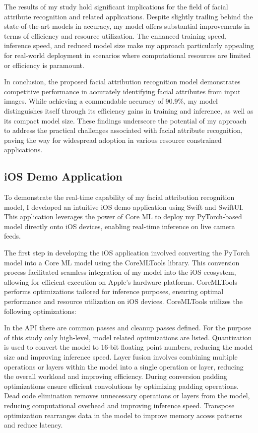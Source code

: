 \documentclass[a4paper,oneside]{article}
\begin{document}
The results of my study hold significant implications for the field of facial attribute recognition and related applications.
Despite slightly trailing behind the state-of-the-art models in accuracy, my model offers substantial improvements in terms of efficiency and resource utilization.
The enhanced training speed, inference speed, and reduced model size make my approach particularly appealing for real-world deployment in scenarios where computational resources are limited or efficiency is paramount.

In conclusion, the proposed facial attribution recognition model demonstrates competitive performance in accurately identifying facial attributes from input images.
While achieving a commendable accuracy of 90.9\%, my model distinguishes itself through its efficiency gains in training and inference, as well as its compact model size.
These findings underscore the potential of my approach to address the practical challenges associated with facial attribute recognition, paving the way for widespread adoption in various resource constrained applications.

\subsection{iOS Demo Application}
\label{sec:subsection_ios_demo}

To demonstrate the real-time capability of my facial attribution recognition model, I developed an intuitive iOS demo application using Swift and SwiftUI.
This application leverages the power of Core ML to deploy my PyTorch-based model directly onto iOS devices, enabling real-time inference on live camera feeds.

The first step in developing the iOS application involved converting the PyTorch model into a Core ML model using the CoreMLTools library.
This conversion process facilitated seamless integration of my model into the iOS ecosystem, allowing for efficient execution on Apple's hardware platforms.
CoreMLTools performs optimizations tailored for inference purposes, ensuring optimal performance and resource utilization on iOS devices.
CoreMLTools utilizes the following optimizations:


In the API there are common passes and cleanup passes defined.
For the purpose of this study only high-level, model related optimizations are listed.
Quantization is used to convert the model to 16-bit floating point numbers, reducing the model size and improving inference speed.
Layer fusion involves combining multiple operations or layers within the model into a single operation or layer, reducing the overall workload and improving efficiency.
During conversion padding optimizations ensure efficient convolutions by optimizing padding operations.
Dead code elimination removes unnecessary operations or layers from the model, reducing computational overhead and improving inference speed.
Transpose optimization rearranges data in the model to improve memory access patterns and reduce latency.
\end{document}
